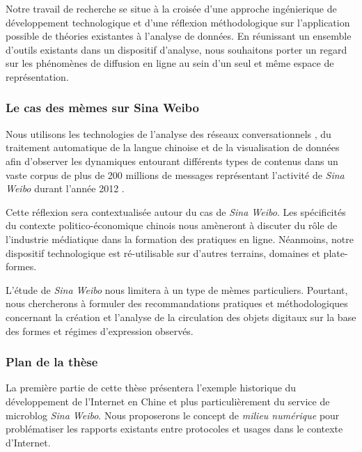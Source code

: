 Notre travail de recherche se situe à la croisée d'une approche ingénierique de développement technologique et d'une réflexion méthodologique sur l'application possible de théories existantes à l'analyse de données. En réunissant un ensemble d'outils existants dans un dispositif d'analyse, nous souhaitons porter un regard sur les phénomènes de diffusion en ligne au sein d'un seul et même espace de représentation.

\subsubsection{Le cas des mèmes sur Sina Weibo}

Nous utilisons les technologies de l'analyse des réseaux conversationnels \citep{Weng2012}, du traitement automatique de la langue chinoise \citep{Xue2003} et de la visualisation de données \citep{Cairo2012} afin d'observer les dynamiques entourant différents types de contenus dans un vaste corpus de plus de 200 millions de messages représentant l'activité de \textit{Sina Weibo} durant l'année 2012 \citep{Fu2013}. 

Cette réflexion sera contextualisée autour du cas de \textit{Sina Weibo}. Les spécificités du contexte politico-économique chinois nous amèneront à discuter du rôle de l'industrie médiatique dans la formation des pratiques en ligne. Néanmoins, notre dispositif technologique est ré-utilisable sur d'autres terrains, domaines et plate-formes. 

L'étude de \textit{Sina Weibo} nous limitera à un type de mèmes particuliers. Pourtant, nous chercherons à formuler des recommandations pratiques et méthodologiques concernant la création et l'analyse de la circulation des objets digitaux sur la base des formes et régimes d'expression observés.  

\subsubsection{Plan de la thèse}


La première partie de cette thèse présentera l'exemple historique du développement de l'Internet en Chine et plus particulièrement du service de microblog \textit{Sina Weibo}. Nous proposerons le concept de \textit{milieu numérique} pour problématiser les rapports existants entre protocoles et usages dans le contexte d'Internet.

